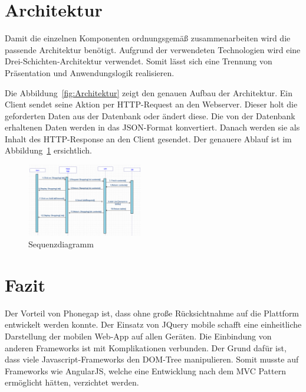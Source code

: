 \documentclass[10pt, conference, compsocconf]{IEEEtran}
\begin{document}
\section{Architektur}
{Damit die einzelnen Komponenten ordnungsgem\"a{\ss} zusammenarbeiten wird die passende Architektur ben\"otigt. Aufgrund der verwendeten Technologien wird eine Drei-Schichten-Architektur verwendet. Somit l\"asst sich eine Trennung von Pr\"asentation und Anwendungslogik realisieren.
	
Die Abbildung~\ref{fig:Architektur} zeigt den genauen Aufbau der Architektur. Ein Client sendet seine Aktion per HTTP-Request an den Webserver. Dieser holt die geforderten Daten aus der Datenbank oder \"andert diese. Die von der Datenbank erhaltenen Daten werden in das JSON-Format konvertiert. Danach werden sie als Inhalt des HTTP-Response an den Client gesendet. Der genauere Ablauf ist im Abbildung~\ref{fig:Sequenzdiagramm} ersichtlich.

\begin{figure}[h!]
	\centering
	\includegraphics[width=0.45\textwidth]{./Bilder_Zeichnungen/Sequenzdiagramm.png}
	\caption{Sequenzdiagramm}
	\label{fig:Sequenzdiagramm}
\end{figure}

\section{Fazit}
Der Vorteil von Phonegap ist, dass ohne gro{\ss}e R\"ucksichtnahme auf die Plattform entwickelt werden konnte. 
Der Einsatz von JQuery mobile schafft eine einheitliche Darstellung der mobilen Web-App auf allen Ger\"aten.
Die Einbindung von anderen Frameworks ist mit Komplikationen verbunden.
Der Grund daf\"ur ist, dass viele Javascript-Frameworks den DOM-Tree manipulieren. 
Somit musste auf Frameworks wie AngularJS, welche eine Entwicklung nach dem MVC Pattern erm\"oglicht h\"atten, verzichtet werden.


}
\end{document}
